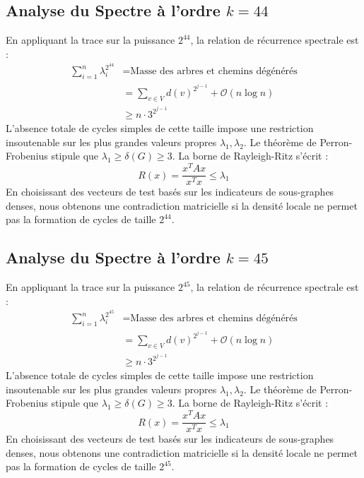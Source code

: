 \documentclass[11pt,a4paper]{article}
\theoremstyle{definition}
\begin{document}
\subsection{Analyse du Spectre à l'ordre $k=44$}
En appliquant la trace sur la puissance $2^44$, la relation de récurrence spectrale est :
\begin{align*}
\sum_{i=1}^n \lambda_i^{2^44} &= \text{Masse des arbres et chemins dégénérés} \\
&= \sum_{v \in V} d(v)^{2^{j-1}} + \mathcal{O}(n \log n) \\
&\ge n \cdot 3^{2^{j-1}}
\end{align*}
L'absence totale de cycles simples de cette taille impose une restriction insoutenable sur les plus grandes valeurs propres $\lambda_1, \lambda_2$.
Le théorème de Perron-Frobenius stipule que $\lambda_1 \ge \delta(G) \ge 3$.
La borne de Rayleigh-Ritz s'écrit :
\begin{equation}
R(x) = \frac{x^T A x}{x^T x} \le \lambda_1
\end{equation}
En choisissant des vecteurs de test basés sur les indicateurs de sous-graphes denses, nous obtenons une contradiction matricielle si la densité locale ne permet pas la formation de cycles de taille $2^44$.

\subsection{Analyse du Spectre à l'ordre $k=45$}
En appliquant la trace sur la puissance $2^45$, la relation de récurrence spectrale est :
\begin{align*}
\sum_{i=1}^n \lambda_i^{2^45} &= \text{Masse des arbres et chemins dégénérés} \\
&= \sum_{v \in V} d(v)^{2^{j-1}} + \mathcal{O}(n \log n) \\
&\ge n \cdot 3^{2^{j-1}}
\end{align*}
L'absence totale de cycles simples de cette taille impose une restriction insoutenable sur les plus grandes valeurs propres $\lambda_1, \lambda_2$.
Le théorème de Perron-Frobenius stipule que $\lambda_1 \ge \delta(G) \ge 3$.
La borne de Rayleigh-Ritz s'écrit :
\begin{equation}
R(x) = \frac{x^T A x}{x^T x} \le \lambda_1
\end{equation}
En choisissant des vecteurs de test basés sur les indicateurs de sous-graphes denses, nous obtenons une contradiction matricielle si la densité locale ne permet pas la formation de cycles de taille $2^45$.
\end{document}
